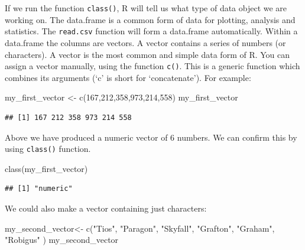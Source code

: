 \documentclass[
]{book}
\newenvironment{Shaded}{\begin{snugshade}}{\end{snugshade}}
\newcommand{\DecValTok}[1]{\textcolor[rgb]{0.00,0.00,0.81}{#1}}
\newcommand{\FunctionTok}[1]{\textcolor[rgb]{0.00,0.00,0.00}{#1}}
\newcommand{\NormalTok}[1]{#1}
\newcommand{\OtherTok}[1]{\textcolor[rgb]{0.56,0.35,0.01}{#1}}
\newcommand{\StringTok}[1]{\textcolor[rgb]{0.31,0.60,0.02}{#1}}
\begin{document}
If we run the function \texttt{class()}, R will tell us what type of data object we are working on. The data.frame is a common form of data for plotting, analysis and statistics. The \texttt{read.csv} function will form a data.frame automatically. Within a data.frame the columns are vectors. A vector contains a series of numbers (or characters). A vector is the most common and simple data form of R. You can assign a vector manually, using the function \texttt{c()}. This is a generic function which combines its arguments (`c' is short for `concatenate'). For example:

\begin{Shaded}
\begin{Highlighting}[]
\NormalTok{my\_first\_vector }\OtherTok{\textless{}{-}} \FunctionTok{c}\NormalTok{(}\DecValTok{167}\NormalTok{,}\DecValTok{212}\NormalTok{,}\DecValTok{358}\NormalTok{,}\DecValTok{973}\NormalTok{,}\DecValTok{214}\NormalTok{,}\DecValTok{558}\NormalTok{)}
\NormalTok{my\_first\_vector}
\end{Highlighting}
\end{Shaded}

\begin{verbatim}
## [1] 167 212 358 973 214 558
\end{verbatim}

Above we have produced a numeric vector of 6 numbers. We can confirm this by using \texttt{class()} function.

\begin{Shaded}
\begin{Highlighting}[]
\FunctionTok{class}\NormalTok{(my\_first\_vector)}
\end{Highlighting}
\end{Shaded}

\begin{verbatim}
## [1] "numeric"
\end{verbatim}

We could also make a vector containing just characters:

\begin{Shaded}
\begin{Highlighting}[]
\NormalTok{my\_second\_vector}\OtherTok{\textless{}{-}} \FunctionTok{c}\NormalTok{(}\StringTok{"Tios"}\NormalTok{, }\StringTok{"Paragon"}\NormalTok{, }\StringTok{"Skyfall"}\NormalTok{, }\StringTok{"Grafton"}\NormalTok{, }\StringTok{"Graham"}\NormalTok{, }\StringTok{"Robigus"}\NormalTok{ )}
\NormalTok{my\_second\_vector}
\end{Highlighting}
\end{Shaded}
\end{document}
